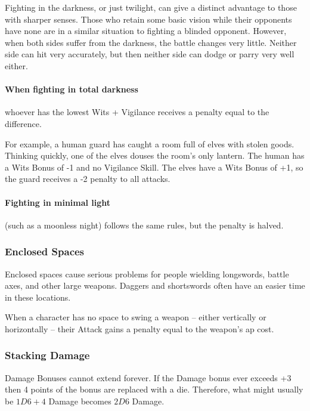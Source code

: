 \begin{multicols}{2}
Fighting in the darkness, or just twilight, can give a distinct advantage to those with sharper senses.
Those who retain some basic vision while their opponents have none are in a similar situation to fighting a blinded opponent.
However, when both sides suffer from the darkness, the battle changes very little.
Neither side can hit very accurately, but then neither side can dodge or parry very well either.

\paragraph*{When fighting in total darkness}
whoever has the lowest Wits + Vigilance receives a penalty equal to the difference.

For example, a human guard has caught a room full of elves with stolen goods.
Thinking quickly, one of the elves douses the room's only lantern.
The human has a Wits Bonus of -1 and no Vigilance Skill.
The elves have a Wits Bonus of +1, so the guard receives a -2 penalty to all attacks.

\paragraph*{Fighting in minimal light}
(such as a moonless night)
follows the same rules, but the penalty is halved.

\subsubsection[Enclosed Spaces: Penalty equals weapon's AP cost]{Enclosed Spaces}
\label{enclosedcombat}

Enclosed spaces cause serious problems for people wielding longswords, battle axes, and other large weapons.
Daggers and shortswords often have an easier time in these locations.

When a character has no space to swing a weapon -- either vertically or horizontally -- their Attack gains a penalty equal to the weapon's \gls{ap} cost.

\subsubsection{Stacking Damage}

Damage Bonuses cannot extend forever. If the Damage bonus ever exceeds +3 then 4 points of the bonus are replaced with a die. Therefore, what might usually be $1D6+4$ Damage becomes $2D6$ Damage.


\end{multicols}
